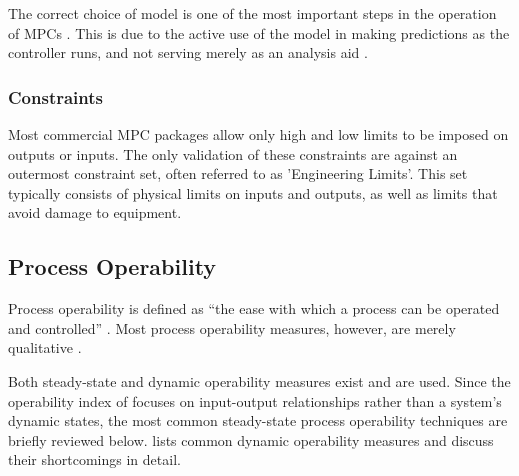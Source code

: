 \documentclass[final,authoryear,5pt,times,twocolumn]{elsarticle}
\begin{document}
The correct choice of model is one of the most important steps in the operation of MPCs \citep[17]{rossiter}.
This is due to the active use of the model in making predictions as the controller runs, and not serving merely as an analysis aid \citep[37]{maciejowskimpc}.

\subsubsection{Constraints}\label{sec:mpccons}
Most commercial MPC packages allow only high and low limits to be imposed on outputs or inputs.
The only validation of these constraints are against an outermost constraint set, often referred to as 'Engineering Limits'.
This set typically consists of physical limits on inputs and outputs, as well as limits that avoid damage to equipment.

\subsection{Process Operability}
Process operability is defined as ``the ease with which a process can be operated and controlled'' \citep[778]{marlin}.
Most process operability measures, however, are merely qualitative \citep[164]{skogestad}.

Both steady-state and dynamic operability measures exist and are used.
Since the operability index of \citet{vinsonartoi} focuses on input-output relationships rather than a system's dynamic states, the most common steady-state process operability techniques are briefly reviewed below.
\citet{vinsonphd} lists common dynamic operability measures and discuss their shortcomings in detail.
\end{document}
